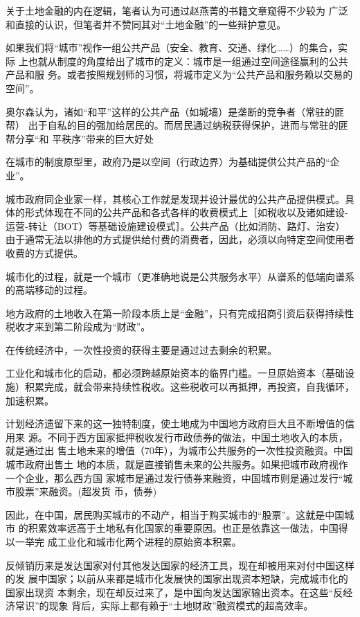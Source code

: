 关于土地金融的内在逻辑，笔者认为可通过赵燕菁的书籍文章\cite{dajueqi}窥得不少较为
广泛和直接的认识，但笔者并不赞同其对“土地金融”的一些辩护意见。




如果我们将“城市”视作一组公共产品（安全、教育、交通、绿化……）的集合，实际
上也就从制度的角度给出了城市的定义：城市是一组通过空间途径赢利的公共产品和服
务。或者按照规划师的习惯，将城市定义为“公共产品和服务赖以交易的空间”。

奥尔森认为，诸如“和平”这样的公共产品（如城墙）是垄断的竞争者（常驻的匪帮）
出于自私的目的强加给居民的。而居民通过纳税获得保护，进而与常驻的匪帮分享“和
平秩序”带来的巨大好处

在城市的制度原型里，政府乃是以空间（行政边界）为基础提供公共产品的“企业”。

城市政府同企业家一样，其核心工作就是发现并设计最优的公共产品提供模式。具体的形式体现在不同的公共产品和各式各样的收费模式上［如税收以及诸如建设-运营-转让（BOT）等基础设施建设模式］。公共产品（比如消防、路灯、治安）由于通常无法以排他的方式提供给付费的消费者，因此，必须以向特定空间使用者收费的方式提供。

城市化的过程，就是一个城市（更准确地说是公共服务水平）从谱系的低端向谱系的高端移动的过程。

地方政府的土地收入在第一阶段本质上是“金融”，只有完成招商引资后获得持续性税收才来到第二阶段成为“财政”。

在传统经济中，一次性投资的获得主要是通过过去剩余的积累。

工业化和城市化的启动，都必须跨越原始资本的临界门槛。一旦原始资本（基础设施）积累完成，就会带来持续性税收。这些税收可以再抵押，再投资，自我循环，加速积累。

计划经济遗留下来的这一独特制度，使土地成为中国地方政府巨大且不断增值的信用来
源。不同于西方国家抵押税收发行市政债券的做法，中国土地收入的本质，就是通过出
售土地未来的增值（70年），为城市公共服务的一次性投资融资。中国城市政府出售土
地的本质，就是直接销售未来的公共服务。如果把城市政府视作一个企业，那么西方国
家城市是通过发行债券来融资，中国城市则是通过发行“城市股票”来融资。(超发货
币，债券)

因此，在中国，居民购买城市的不动产，相当于购买城市的“股票”。这就是中国城市
的积累效率远高于土地私有化国家的重要原因。也正是依靠这一做法，中国得以一举完
成工业化和城市化两个进程的原始资本积累。

反倾销历来是发达国家对付其他发达国家的经济工具，现在却被用来对付中国这样的发
展中国家；以前从来都是城市化发展快的国家出现资本短缺，完成城市化的国家出现资
本剩余，现在却反过来了，是中国向发达国家输出资本。在这些“反经济常识”的现象
背后，实际上都有赖于“土地财政”融资模式的超高效率。

